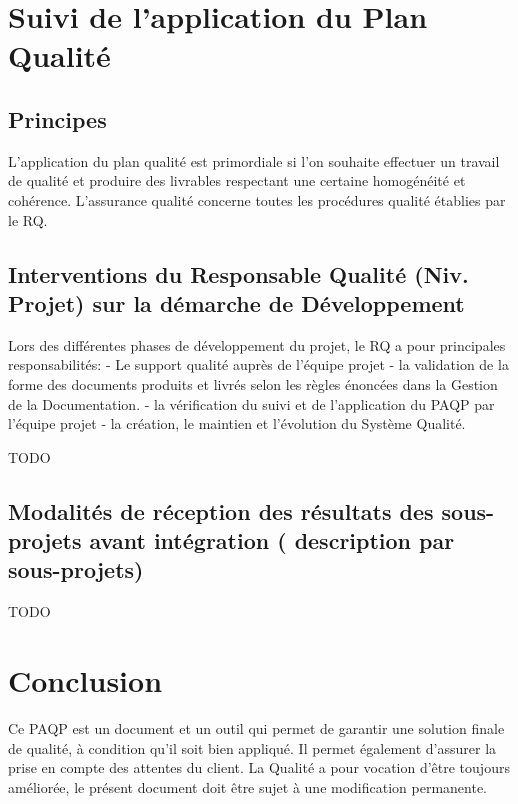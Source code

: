 \section{Suivi de l’application du Plan Qualité}
    \subsection{Principes}
    L'application du plan qualité est primordiale si l'on souhaite effectuer un travail de qualité et produire des livrables respectant une certaine homogénéité et cohérence.
    L'assurance qualité concerne toutes les procédures qualité établies par le RQ.
    \subsection{Interventions du Responsable Qualité (Niv. Projet) sur la démarche de Développement}
    Lors des différentes phases de développement du projet, le RQ a pour principales responsabilités: - Le support qualité auprès de l'équipe projet - la validation de la forme des documents produits et livrés selon les règles énoncées dans la Gestion de la Documentation. - la vérification du suivi et de l'application du PAQP par l'équipe projet - la création, le maintien et l'évolution du Système Qualité.
    
    \begin{center} \begin{Large}TODO\end{Large}  \end{center}
  \subsection{Modalités de réception des résultats des sous-projets avant intégration	( description par sous-projets)}
      \begin{center} \begin{Large}TODO\end{Large}  \end{center}
\section{Conclusion}
Ce PAQP est un document et un outil qui permet de garantir une solution finale de qualité, à condition qu'il soit bien appliqué.
Il permet également d'assurer la prise en compte des attentes du client.
La Qualité a pour vocation d'être toujours améliorée, le présent document doit être sujet à une modification permanente.